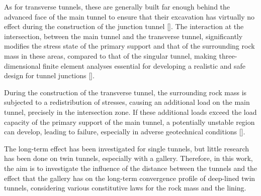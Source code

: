 \documentclass[a4paper,fleqn]{cas-sc}
\begin{document}
As for transverse tunnels, these are generally built far enough behind the advanced face of the main tunnel to ensure that their excavation has virtually no effect during the construction of the junction tunnel []. The interaction at the intersection, between the main tunnel and the transverse tunnel, significantly modifies the stress state of the primary support and that of the surrounding rock mass in these areas, compared to that of the singular tunnel, making three-dimensional finite element analyses essential for developing a realistic and safe design for tunnel junctions [].

During the construction of the transverse tunnel, the surrounding rock mass is subjected to a redistribution of stresses, causing an additional load on the main tunnel, precisely in the intersection zone. If these additional loads exceed the load capacity of the primary support of the main tunnel, a potentially unstable region can develop, leading to failure, especially in adverse geotechnical conditions [].

The long-term effect has been investigated for single tunnels, but little research has been done on twin tunnels, especially with a gallery. Therefore, in this work, the aim is to investigate the influence of the distance between the tunnels and the effect that the gallery has on the long-term convergence profile of deep-lined twin tunnels, considering various constitutive laws for the rock mass and the lining.






\end{document}
